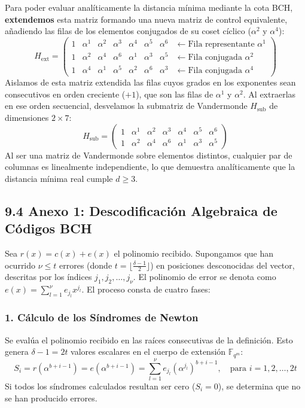 \documentclass{article}
\begin{document}
Para poder evaluar analíticamente la distancia mínima mediante la cota BCH, \textbf{extendemos} esta matriz formando una nueva matriz de control equivalente, añadiendo las filas de los elementos conjugados de su coset cíclico ($\alpha^2$ y $\alpha^4$):
\[
H_{\text{ext}} = \begin{pmatrix}
1 & \alpha^1 & \alpha^2 & \alpha^3 & \alpha^4 & \alpha^5 & \alpha^6 & \leftarrow \text{Fila representante } \alpha^1 \\
1 & \alpha^2 & \alpha^4 & \alpha^6 & \alpha^1 & \alpha^3 & \alpha^5 & \leftarrow \text{Fila conjugada } \alpha^2 \\
1 & \alpha^4 & \alpha^1 & \alpha^5 & \alpha^2 & \alpha^6 & \alpha^3 & \leftarrow \text{Fila conjugada } \alpha^4
\end{pmatrix}
\]
Aislamos de esta matriz extendida las filas cuyos grados en los exponentes sean consecutivos en orden creciente ($+1$), que son las filas de $\alpha^1$ y $\alpha^2$. Al extraerlas en ese orden secuencial, desvelamos la submatriz de Vandermonde $H_{\text{sub}}$ de dimensiones $2 \times 7$:
\[
H_{\text{sub}} = \begin{pmatrix}
1 & \alpha^1 & \alpha^2 & \alpha^3 & \alpha^4 & \alpha^5 & \alpha^6 \\
1 & \alpha^2 & \alpha^4 & \alpha^6 & \alpha^1 & \alpha^3 & \alpha^5
\end{pmatrix}
\]
Al ser una matriz de Vandermonde sobre elementos distintos, cualquier par de columnas es linealmente independiente, lo que demuestra analíticamente que la distancia mínima real cumple $d \ge 3$.

\newpage
\subsection{9.4 Anexo 1: Descodificación Algebraica de Códigos BCH}

Sea $r(x) = c(x) + e(x)$ el polinomio recibido. Supongamos que han ocurrido $\nu \le t$ errores (donde $t = \lfloor \frac{\delta-1}{2} \rfloor$) en posiciones desconocidas del vector, descritas por los índices $j_1, j_2, \dots, j_\nu$. El polinomio de error se denota como $e(x) = \sum_{l=1}^{\nu} e_{j_l} x^{j_l}$. El proceso consta de cuatro fases:

\subsubsection{1. Cálculo de los Síndromes de Newton}
Se evalúa el polinomio recibido en las raíces consecutivas de la definición. Esto genera $\delta-1 = 2t$ valores escalares en el cuerpo de extensión $\mathbb{F}_{q^m}$:
\[
S_i = r(\alpha^{b+i-1}) = e(\alpha^{b+i-1}) = \sum_{l=1}^{\nu} e_{j_l} (\alpha^{j_l})^{b+i-1}, \quad \text{para } i = 1, 2, \dots, 2t
\]
Si todos los síndromes calculados resultan ser cero ($S_i = 0$), se determina que no se han producido errores.
\end{document}
